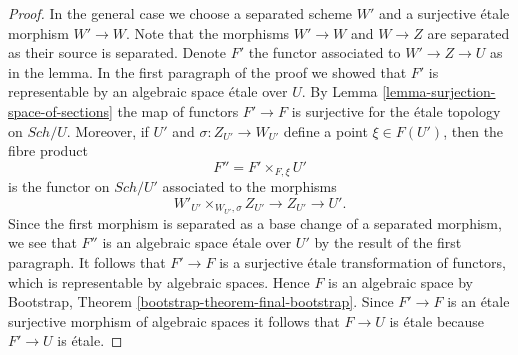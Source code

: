 \documentclass{stacks-project}
\theoremstyle{plain}
\theoremstyle{definition}
\theoremstyle{remark}
\numberwithin{equation}{subsection}
\def\Sch{\mathit{Sch}}
\begin{document}
\begin{proof}
\medskip\noindent
In the general case we choose a separated scheme $W'$ and a surjective
\'etale morphism $W' \to W$. Note that the morphisms $W' \to W$ and
$W \to Z$ are separated as their source is separated. Denote $F'$ the
functor associated to $W' \to Z \to U$ as in the lemma. In the first
paragraph of the proof we showed that $F'$ is representable by an
algebraic space \'etale over $U$. By
Lemma \ref{lemma-surjection-space-of-sections}
the map of functors $F' \to F$ is surjective for the \'etale topology
on $\Sch/U$. Moreover, if $U'$ and $\sigma : Z_{U'} \to W_{U'}$
define a point $\xi \in F(U')$, then the fibre product
$$
F'' = F' \times_{F, \xi} U'
$$
is the functor on $\Sch/U'$ associated to the morphisms
$$
W'_{U'} \times_{W_{U'}, \sigma} Z_{U'} \to Z_{U'} \to U'.
$$
Since the first morphism is separated as a base change of a separated
morphism, we see that $F''$ is an algebraic space \'etale over $U'$
by the result of the first paragraph. It follows that $F' \to F$ is a
surjective \'etale transformation of functors, which is representable
by algebraic spaces. Hence $F$ is an algebraic space by
Bootstrap, Theorem \ref{bootstrap-theorem-final-bootstrap}.
Since $F' \to F$ is an \'etale surjective morphism of algebraic spaces
it follows that $F \to U$ is \'etale because $F' \to U$ is \'etale.
\end{proof}
\end{document}
